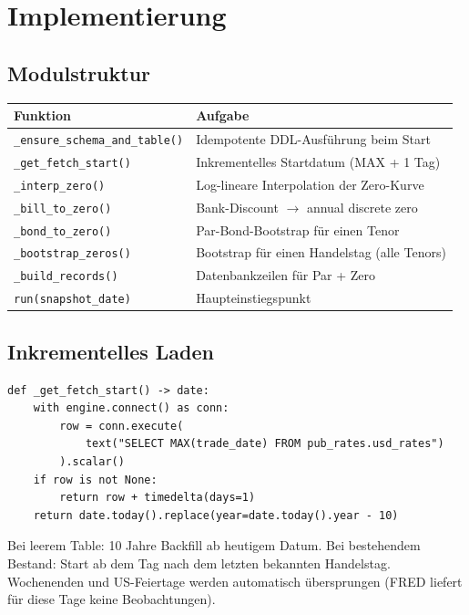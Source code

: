 \documentclass[11pt, a4paper]{article}
\begin{document}
\section{Implementierung}

\subsection{Modulstruktur}

\begin{tabular}{ll}
  \toprule
  Funktion & Aufgabe \\
  \midrule
  \texttt{\_ensure\_schema\_and\_table()} & Idempotente DDL-Ausführung beim Start \\
  \texttt{\_get\_fetch\_start()}           & Inkrementelles Startdatum (MAX + 1 Tag) \\
  \texttt{\_interp\_zero()}               & Log-lineare Interpolation der Zero-Kurve \\
  \texttt{\_bill\_to\_zero()}             & Bank-Discount $\to$ annual discrete zero \\
  \texttt{\_bond\_to\_zero()}             & Par-Bond-Bootstrap für einen Tenor \\
  \texttt{\_bootstrap\_zeros()}           & Bootstrap für einen Handelstag (alle Tenors) \\
  \texttt{\_build\_records()}             & Datenbankzeilen für Par + Zero \\
  \texttt{run(snapshot\_date)}            & Haupteinstiegspunkt \\
  \bottomrule
\end{tabular}

\subsection{Inkrementelles Laden}

\begin{lstlisting}
def _get_fetch_start() -> date:
    with engine.connect() as conn:
        row = conn.execute(
            text("SELECT MAX(trade_date) FROM pub_rates.usd_rates")
        ).scalar()
    if row is not None:
        return row + timedelta(days=1)
    return date.today().replace(year=date.today().year - 10)
\end{lstlisting}

Bei leerem Table: 10 Jahre Backfill ab heutigem Datum.
Bei bestehendem Bestand: Start ab dem Tag nach dem letzten bekannten Handelstag.
Wochenenden und US-Feiertage werden automatisch übersprungen
(FRED liefert für diese Tage keine Beobachtungen).
\end{document}
